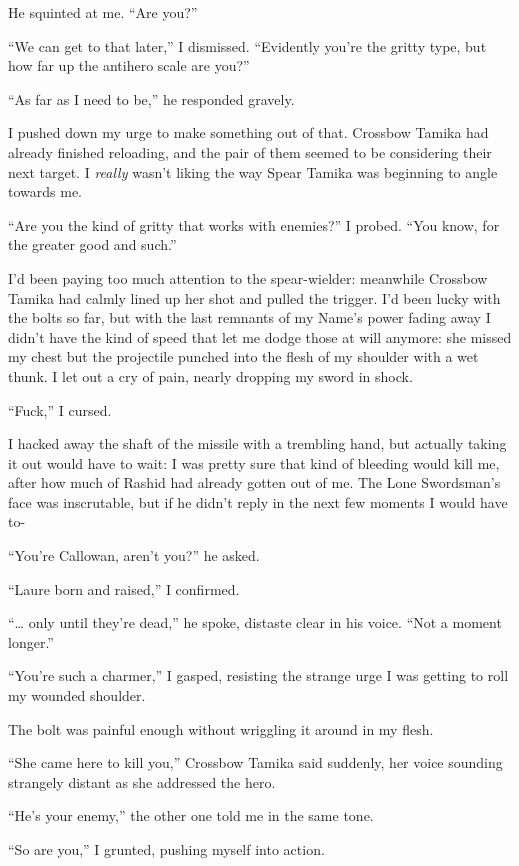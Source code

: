\documentclass[12pt, openany]{book}
\begin{document}
He squinted at me. “Are you?”

“We can get to that later,” I dismissed. “Evidently you’re the gritty type, but how far up the antihero scale are you?”

“As far as I need to be,” he responded gravely.

I pushed down my urge to make something out of that. Crossbow Tamika had already finished reloading, and the pair of them seemed to be considering their next target. I \textit{really} wasn’t liking the way Spear Tamika was beginning to angle towards me.

“Are you the kind of gritty that works with enemies?” I probed. “You know, for the greater good and such.”

I’d been paying too much attention to the spear-wielder: meanwhile Crossbow Tamika had calmly lined up her shot and pulled the trigger. I’d been lucky with the bolts so far, but with the last remnants of my Name’s power fading away I didn’t have the kind of speed that let me dodge those at will anymore: she missed my chest but the projectile punched into the flesh of my shoulder with a wet thunk. I let out a cry of pain, nearly dropping my sword in shock.

“Fuck,” I cursed. 

I hacked away the shaft of the missile with a trembling hand, but actually taking it out would have to wait: I was pretty sure that kind of bleeding would kill me, after how much of Rashid had already gotten out of me. The Lone Swordsman’s face was inscrutable, but if he didn’t reply in the next few moments I would have to-

“You’re Callowan, aren’t you?” he asked.

“Laure born and raised,” I confirmed.

“… only until they’re dead,” he spoke, distaste clear in his voice. “Not a moment longer.”

“You’re such a charmer,” I gasped, resisting the strange urge I was getting to roll my wounded shoulder.

The bolt was painful enough without wriggling it around in my flesh. 

“She came here to kill you,” Crossbow Tamika said suddenly, her voice sounding strangely distant as she addressed the hero.

“He’s your enemy,” the other one told me in the same tone.

“So are you,” I grunted, pushing myself into action.
\end{document}
